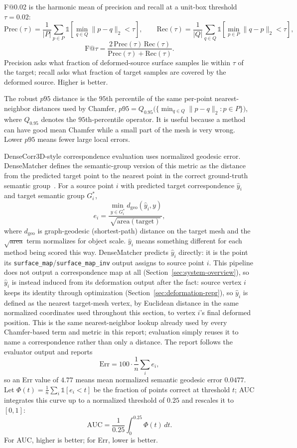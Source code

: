 \documentclass{article}
\makeatletter
\newcommand{\Fscore}{F@0.02}
\makeatother
\begin{document}
\Fscore{} is the harmonic mean of precision and recall at a unit-box threshold $\tau = 0.02$:
\[
\mathrm{Prec}(\tau) = \frac{1}{|P|}\sum_{p \in P} \mathbb{1}\!\left[\min_{q \in Q}\|p-q\|_2 < \tau\right],
\qquad
\mathrm{Rec}(\tau) = \frac{1}{|Q|}\sum_{q \in Q} \mathbb{1}\!\left[\min_{p \in P}\|q-p\|_2 < \tau\right],
\]
\[
\mathrm{F@}\tau = \frac{2\,\mathrm{Prec}(\tau)\,\mathrm{Rec}(\tau)}{\mathrm{Prec}(\tau) + \mathrm{Rec}(\tau)}.
\]
Precision asks what fraction of deformed-source surface samples lie within $\tau$ of the target;
recall asks what fraction of target samples are covered by the deformed source. Higher is better.

The robust $p95$ distance is the $95$th percentile of the same per-point nearest-neighbor
distances used by Chamfer, $p95 = Q_{0.95}\big(\{\min_{q \in Q}\|p-q\|_2 : p \in P\}\big)$, where
$Q_{0.95}$ denotes the $95$th-percentile operator. It is useful because a method can have good mean
Chamfer while a small part of the mesh is very wrong. Lower $p95$ means fewer large local errors.

DenseCorr3D-style correspondence evaluation uses normalized geodesic error. DenseMatcher defines
the semantic-group version of this metric as the distance from the predicted target point to the
nearest point in the correct ground-truth semantic group~\cite{densematcher}. For a source point
$i$ with predicted target correspondence $\hat{y}_i$ and target semantic group $G_i^{*}$,
\[
e_i = \frac{\min_{y \in G_i^{*}} d_{\mathrm{geo}}(\hat{y}_i, y)}{\sqrt{\mathrm{area}(\text{target})}},
\]
where $d_{\mathrm{geo}}$ is graph-geodesic (shortest-path) distance on the target mesh and the
$\sqrt{\mathrm{area}}$ term normalizes for object scale.
$\hat{y}_i$ means something different for
each method being scored this way. DenseMatcher predicts $\hat{y}_i$ directly: it is the point its
\texttt{surface\_map}/\texttt{surface\_map\_inv} output assigns to source point $i$. This pipeline
does not output a correspondence map at all (Section~\ref{sec:system-overview}), so $\hat{y}_i$ is
instead induced from its deformation output after the fact: source vertex $i$ keeps its identity
through optimization (Section~\ref{sec:deformation-repr}), so $\hat{y}_i$ is defined as the nearest
target-mesh vertex, by Euclidean distance in the same normalized coordinates used throughout this
section, to vertex $i$'s final deformed position. This is the same nearest-neighbor lookup already
used by every Chamfer-based term and metric in this report; evaluation simply reuses it to name a
correspondence rather than only a distance. The report follows the evaluator output
and reports
\[
\mathrm{Err} = 100 \cdot \frac{1}{n}\sum_i e_i ,
\]
so an Err value of $4.77$ means mean normalized semantic geodesic error $0.0477$. Let
$\Phi(t) = \frac{1}{n}\sum_i \mathbb{1}[e_i < t]$ be the fraction of points correct at threshold
$t$; AUC integrates this curve up to a normalized threshold of $0.25$ and rescales it to $[0,1]$:
\[
\mathrm{AUC} = \frac{1}{0.25}\int_0^{0.25} \Phi(t)\,dt .
\]
For AUC, higher is better; for Err, lower is better.
\end{document}
